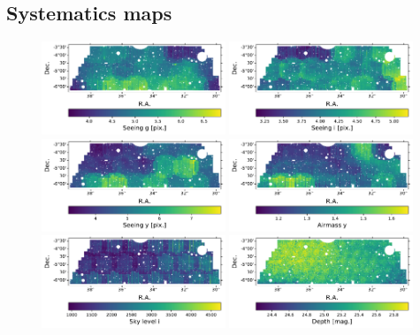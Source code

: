 \documentclass[a4paper,11pt]{article}
\begin{document}
  \subsection{Systematics maps}\label{ssec:methods.syst}
    \begin{figure}
      \centering
      \includegraphics[width=0.49\textwidth]{figures/syst_seeing_g.pdf}
      \includegraphics[width=0.49\textwidth]{figures/syst_seeing_i.pdf}
      \includegraphics[width=0.49\textwidth]{figures/syst_seeing_y.pdf}
      \includegraphics[width=0.49\textwidth]{figures/syst_airmass_y.pdf}
      \includegraphics[width=0.49\textwidth]{figures/syst_skylevel_i.pdf}
      \includegraphics[width=0.49\textwidth]{figures/syst_depth.pdf}

\end{figure}
\end{document}
